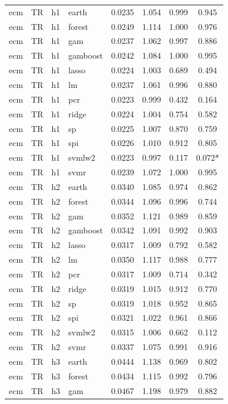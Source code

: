 \begin{ThreePartTable}
\begin{longtable}[t]{llclcccc}
\addlinespace
ecm & TR & h1 & earth & 0.0235 & 1.054 & 0.999 & 0.945\\
ecm & TR & h1 & forest & 0.0249 & 1.114 & 1.000 & 0.976\\
ecm & TR & h1 & gam & 0.0237 & 1.062 & 0.997 & 0.886\\
ecm & TR & h1 & gamboost & 0.0242 & 1.084 & 1.000 & 0.995\\
ecm & TR & h1 & lasso & 0.0224 & 1.003 & 0.689 & 0.494\\
ecm & TR & h1 & lm & 0.0237 & 1.061 & 0.996 & 0.880\\
ecm & TR & h1 & pcr & 0.0223 & 0.999 & 0.432 & 0.164\\
ecm & TR & h1 & ridge & 0.0224 & 1.004 & 0.754 & 0.582\\
ecm & TR & h1 & sp & 0.0225 & 1.007 & 0.870 & 0.759\\
ecm & TR & h1 & spi & 0.0226 & 1.010 & 0.912 & 0.805\\
ecm & TR & h1 & svmlw2 & 0.0223 & 0.997 & 0.117 & 0.072*\\
ecm & TR & h1 & svmr & 0.0239 & 1.072 & 1.000 & 0.995\\
\addlinespace
ecm & TR & h2 & earth & 0.0340 & 1.085 & 0.974 & 0.862\\
ecm & TR & h2 & forest & 0.0344 & 1.096 & 0.996 & 0.744\\
ecm & TR & h2 & gam & 0.0352 & 1.121 & 0.989 & 0.859\\
ecm & TR & h2 & gamboost & 0.0342 & 1.091 & 0.992 & 0.903\\
ecm & TR & h2 & lasso & 0.0317 & 1.009 & 0.792 & 0.582\\
ecm & TR & h2 & lm & 0.0350 & 1.117 & 0.988 & 0.777\\
ecm & TR & h2 & pcr & 0.0317 & 1.009 & 0.714 & 0.342\\
ecm & TR & h2 & ridge & 0.0319 & 1.015 & 0.912 & 0.770\\
ecm & TR & h2 & sp & 0.0319 & 1.018 & 0.952 & 0.865\\
ecm & TR & h2 & spi & 0.0321 & 1.022 & 0.961 & 0.866\\
ecm & TR & h2 & svmlw2 & 0.0315 & 1.006 & 0.662 & 0.112\\
ecm & TR & h2 & svmr & 0.0337 & 1.075 & 0.991 & 0.916\\
\addlinespace
ecm & TR & h3 & earth & 0.0444 & 1.138 & 0.969 & 0.802\\
ecm & TR & h3 & forest & 0.0434 & 1.115 & 0.992 & 0.796\\
ecm & TR & h3 & gam & 0.0467 & 1.198 & 0.979 & 0.882\\

\end{longtable}
\end{ThreePartTable}
